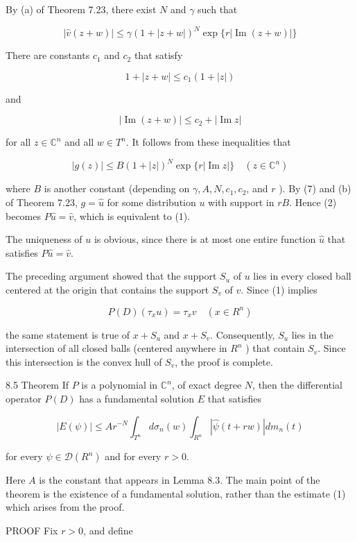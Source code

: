 \documentclass[10pt]{article}
\begin{document}
By (a) of Theorem 7.23, there exist $N$ and $\gamma$ such that

$$
|\hat{v}(z+w)| \leq \gamma(1+|z+w|)^{N} \exp \{r|\operatorname{Im}(z+w)|\}
$$

There are constants $c_{1}$ and $c_{2}$ that satisfy

$$
1+|z+w| \leq c_{1}(1+|z|)
$$

and

$$
|\operatorname{Im}(z+w)| \leq c_{2}+|\operatorname{Im} z|
$$

for all $z \in \mathbb{C}^{n}$ and all $w \in T^{n}$. It follows from these inequalities that

$$
|g(z)| \leq B(1+|z|)^{N} \exp \{r|\operatorname{Im} z|\} \quad\left(z \in \mathbb{C}^{n}\right)
$$

where $B$ is another constant (depending on $\gamma, A, N, c_{1}, c_{2}$, and $r$ ). By (7) and (b) of Theorem 7.23, $g=\hat{u}$ for some distribution $u$ with support in $r B$. Hence (2) becomes $P \hat{u}=\hat{v}$, which is equivalent to (1).

The uniqueness of $u$ is obvious, since there is at most one entire function $\hat{u}$ that satisfies $P \hat{u}=\hat{v}$.

The preceding argument showed that the support $S_{u}$ of $u$ lies in every closed ball centered at the origin that contains the support $S_{v}$ of $v$. Since (1) implies

$$
P(D)\left(\tau_{x} u\right)=\tau_{x} v \quad\left(x \in R^{n}\right)
$$

the same statement is true of $x+S_{u}$ and $x+S_{v}$. Consequently, $S_{u}$ lies in the intersection of all closed balls (centered anywhere in $R^{n}$ ) that contain $S_{v}$. Since this intersection is the convex hull of $S_{v}$, the proof is complete.

8.5 Theorem If $P$ is a polynomial in $\mathbb{C}^{n}$, of exact degree $N$, then the differential operator $P(D)$ has a fundamental solution $E$ that satisfies

$$
|E(\psi)| \leq A r^{-N} \int_{T^{n}} d \sigma_{n}(w) \int_{R^{n}}|\hat{\psi}(t+r w)| d m_{n}(t)
$$

for every $\psi \in \mathscr{D}\left(R^{n}\right)$ and for every $r>0$.

Here $A$ is the constant that appears in Lemma 8.3. The main point of the theorem is the existence of a fundamental solution, rather than the estimate (1) which arises from the proof.

PROOF Fix $r>0$, and define
\end{document}
